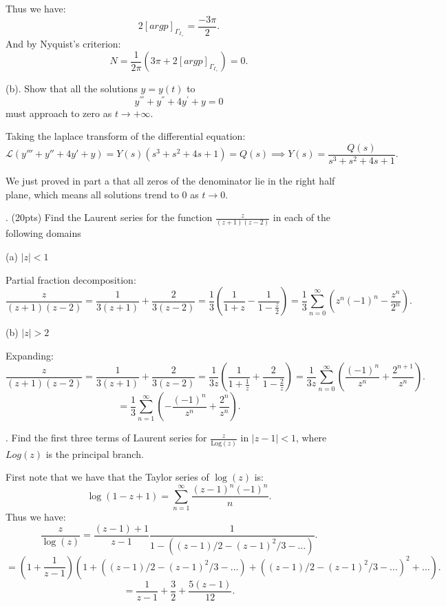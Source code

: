 \documentclass[letterpaper, reqno,11pt]{article}
\begin{document}
Thus we have: 
\[
2[arg p]_{\Gamma_{I_+}}=\frac{-3\pi}{2}
.\]
And by Nyquist's criterion: 
\[
N=\frac{1}{2\pi}\left( 3\pi+2[arg p]_{\Gamma_{I_+}} \right)=0
.\]

\medskip

\noindent
(b). Show that all  the solutions $ y= y(t)$ to
$$ y^{'''}+ y^{''} + 4 y^{'} +y=0$$
must approach to zero as $ t\to +\infty$.

Taking the laplace transform of the differential equation: 
\[
\mathcal L(y'''+ y''+ 4 y' +y)=Y(s)\left( s^3+s^2+4s+1 \right)=Q(s)\implies Y(s)=\frac{Q(s)}{s^3+s^2+4s+1}
.\]

We just proved in part a that all zeros of the denominator lie in the right half plane, which means all solutions trend to $0$ as $t\to 0$. 

\medskip

. (20pts) Find the Laurent series for the function $ \frac{z}{ (z+1)(z-2)}$ in each of the following domains

(a) $ |z|<1$

Partial fraction decomposition: 
\[
\frac{z}{(z+1)(z-2)}=\frac{1}{3(z+1)}+\frac{2}{3(z-2)}=\frac{1}{3}\left( \frac{1}{1+z}-\frac{1}{1-\frac{z}{2}} \right) =\frac{1}{3}\sum_{n=0}^\infty \left( z^{n}(-1)^{n}-\frac{z^{n}}{2^{n}} \right) 
.\]

(b) $ |z|>2$

Expanding: 
\[
\frac{z}{(z+1)(z-2)}=\frac{1}{3(z+1)}+\frac{2}{3(z-2)}=\frac{1}{3z}\left( \frac{1}{1+\frac{1}{z}}+\frac{2}{1-\frac{2}{z}} \right) =\frac{1}{3z}\sum_{n=0}^\infty \left(\frac{(-1)^{n}}{z^{n}}+\frac{2^{n+1}}{z^{n}}\right)
.\]
\[
=\frac{1}{3}\sum_{n=1}^\infty \left(-\frac{(-1)^{n}}{z^{n}}+\frac{2^{n}}{z^{n}}\right)
.\]

\medskip

. Find the first three terms of Laurent series for $\frac{z}{ \mbox{Log} (z)}$   in $|z-1| <1$, where $ Log (z)$ is the principal branch.

First note that we have that the Taylor series of $\log(z)$ is: 
\[
\log(1-z+1)=\sum_{n=1}^{\infty}\frac{(z-1)^{n}(-1)^{n}}{n}
.\]
Thus we have:
\[
\frac{z}{\log(z)}=\frac{(z-1)+1}{z-1}\frac{1}{1-((z-1) /2-(z-1)^2 /3-\ldots)}
.\]
\[
=\left( 1+\frac{1}{z-1} \right) \left( 1+((z-1) /2-(z-1)^2 /3-\ldots)+((z-1) /2-(z-1)^2 /3-\ldots)^2+\ldots \right) 
.\]
\[
=\frac{1}{z-1}+\frac{3}{2}+\frac{5(z-1)}{12}
.\]

 
\end{document}
